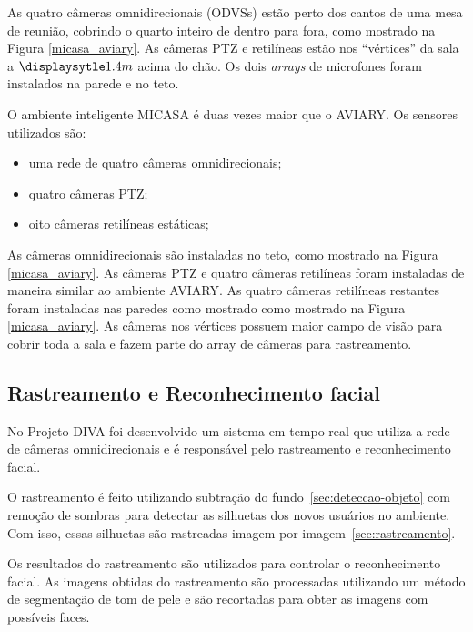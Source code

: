 As quatro câmeras omnidirecionais (ODVSs) estão perto dos cantos de uma mesa de reunião, cobrindo o quarto inteiro de dentro para fora, como mostrado na Figura \ref{micasa_aviary}. As câmeras PTZ e retilíneas estão nos ``vértices'' da sala a $\displaysytle 1.4m$ acima do chão. Os dois \textit{arrays} de microfones foram instalados na parede e no teto.


O ambiente inteligente MICASA é duas vezes maior que o AVIARY. Os sensores utilizados são:
	
	\begin{itemize}
		\item uma rede de quatro câmeras omnidirecionais;
		\item quatro câmeras PTZ;
		\item oito câmeras retilíneas estáticas;
	\end{itemize}

As câmeras omnidirecionais são instaladas no teto, como mostrado na Figura \ref{micasa_aviary}. As câmeras PTZ e quatro câmeras retilíneas foram instaladas de maneira similar ao ambiente AVIARY. As quatro câmeras retilíneas restantes foram instaladas nas paredes como mostrado como mostrado na Figura \ref{micasa_aviary}. As câmeras nos vértices possuem maior campo de visão para cobrir toda a sala e fazem parte do array de câmeras para rastreamento.

\subsection{Rastreamento e Reconhecimento facial}
 
No Projeto DIVA foi desenvolvido um sistema em tempo-real que utiliza a rede de câmeras omnidirecionais e é responsável pelo rastreamento e reconhecimento facial. 

O rastreamento é feito utilizando subtração do fundo~\ref{sec:deteccao-objeto} com remoção de sombras para detectar as silhuetas dos novos usuários no ambiente.  Com isso, essas silhuetas são rastreadas imagem por imagem~\ref{sec:rastreamento}.

Os resultados do rastreamento são utilizados para controlar o reconhecimento facial. As imagens obtidas do rastreamento são processadas utilizando um método de segmentação de tom de pele e são recortadas para obter as imagens com possíveis faces. 

